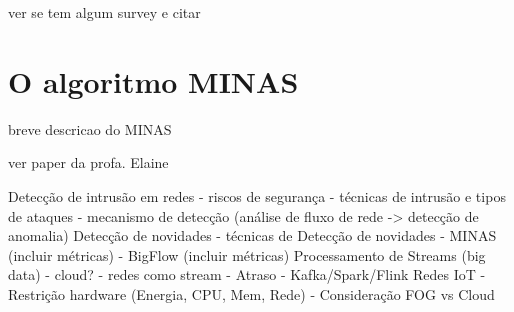 ver se tem algum survey e citar

\section{O algoritmo MINAS}

breve descricao do MINAS

ver paper da profa. Elaine

Detecção de intrusão em redes
    - riscos de segurança
    - técnicas de intrusão e tipos de ataques
    - mecanismo de detecção (análise de fluxo de rede -> detecção de anomalia)
Detecção de novidades
    - técnicas de Detecção de novidades
    - MINAS (incluir métricas) 
    - BigFlow (incluir métricas)
Processamento de Streams (big data)
    - cloud?
    - redes como stream
    - Atraso
    - Kafka/Spark/Flink
Redes IoT
    - Restrição hardware (Energia, CPU, Mem, Rede)
    - Consideração FOG vs Cloud
